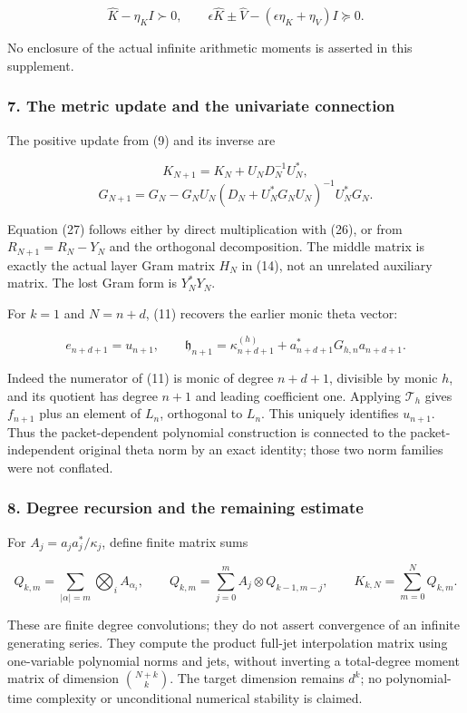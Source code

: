 \[
\widehat K-\eta_KI\succ0,\qquad
\epsilon\widehat K\pm\widehat V
-(\epsilon\eta_K+\eta_V)I\succeq0.
\tag{25}
\]

No enclosure of the actual infinite arithmetic moments is asserted in
this supplement.

\subsubsection{7. The metric update and the univariate
connection}\label{kernel_layer:the-metric-update-and-the-univariate-connection}

The positive update from (9) and its inverse are

\[
\boxed{K_{N+1}=K_N+U_ND_N^{-1}U_N^*,}
\tag{26}
\] \[
\boxed{G_{N+1}=G_N-G_NU_N(D_N+U_N^*G_NU_N)^{-1}U_N^*G_N.}
\tag{27}
\]

Equation (27) follows either by direct multiplication with (26), or from
\(R_{N+1}=R_N-Y_N\) and the orthogonal decomposition. The middle matrix
is exactly the actual layer Gram matrix \(H_N\) in (14), not an
unrelated auxiliary matrix. The lost Gram form is \(Y_N^*Y_N\).

For \(k=1\) and \(N=n+d\), (11) recovers the earlier monic theta vector:

\[
\boxed{e_{n+d+1}=u_{n+1},\qquad
\mathfrak h_{n+1}=\kappa_{n+d+1}^{(h)}
+a_{n+d+1}^*G_{h,n}a_{n+d+1}.}
\tag{28}
\]

Indeed the numerator of (11) is monic of degree \(n+d+1\), divisible by
monic \(h\), and its quotient has degree \(n+1\) and leading coefficient
one. Applying \(\mathcal T_h\) gives \(f_{n+1}\) plus an element of
\(L_n\), orthogonal to \(L_n\). This uniquely identifies \(u_{n+1}\).
Thus the packet-dependent polynomial construction is connected to the
packet-independent original theta norm by an exact identity; those two
norm families were not conflated.

\subsubsection{8. Degree recursion and the remaining
estimate}\label{kernel_layer:degree-recursion-and-the-remaining-estimate}

For \(A_j=a_ja_j^*/\kappa_j\), define finite matrix sums

\[
Q_{k,m}=\sum_{|\alpha|=m}\bigotimes_i A_{\alpha_i},\qquad
Q_{k,m}=\sum_{j=0}^m A_j\otimes Q_{k-1,m-j},\qquad
K_{k,N}=\sum_{m=0}^NQ_{k,m}.
\tag{29}
\]

These are finite degree convolutions; they do not assert convergence of
an infinite generating series. They compute the product full-jet
interpolation matrix using one-variable polynomial norms and jets,
without inverting a total-degree moment matrix of dimension
\(\binom{N+k}{k}\). The target dimension remains \(d^k\); no
polynomial-time complexity or unconditional numerical stability is
claimed.

